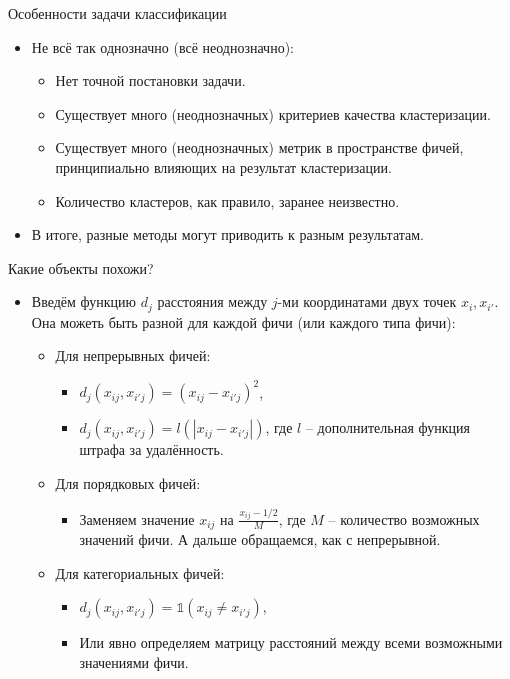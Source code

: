 \documentclass[9pt]{beamer}
\begin{document}
\begin{frame}{Особенности задачи классификации}
\begin{itemize}
    \item Не всё так однозначно (всё неоднозначно):
    \begin{itemize}
        \item Нет точной постановки задачи.
        \item Существует много (неоднозначных) критериев качества кластеризации.
        \item Существует много (неоднозначных) метрик в пространстве фичей, принципиально влияющих на результат кластеризации. 
        \item Количество кластеров, как правило, заранее неизвестно.
    \end{itemize}
    \item В итоге, разные методы могут приводить к разным результатам.
\end{itemize}
\end{frame}

\begin{frame}{Какие объекты похожи?}
\begin{itemize}
    \item Введём функцию $d_j$ расстояния между $j$-ми координатами двух точек $x_i, x_{i'}$. Она можеть быть разной для каждой фичи (или каждого типа фичи):
    \begin{itemize}
        \item Для непрерывных фичей:
        \begin{itemize}
            \item $d_j(x_{ij}, x_{i'j}) = (x_{ij} - x_{i'j})^2$,
            \item $d_j(x_{ij}, x_{i'j}) = l(|x_{ij} - x_{i'j}|)$, где $l$ -- дополнительная функция штрафа за удалённость.
        \end{itemize}
        \item Для порядковых фичей:
        \begin{itemize}
            \item Заменяем значение $x_{ij}$ на $\frac{x_{ij} - 1/2}{M}$, где $M$ -- количество возможных значений фичи.
            А дальше обращаемся, как с непрерывной.
        \end{itemize}
        \item Для категориальных фичей:
        \begin{itemize}
            \item $d_j(x_{ij}, x_{i'j}) = \mathds{1}(x_{ij} \neq x_{i'j})$,
            \item Или явно определяем матрицу расстояний между всеми возможными значениями фичи.
        \end{itemize}
    \end{itemize}
\end{itemize}
\end{frame}
\end{document}
